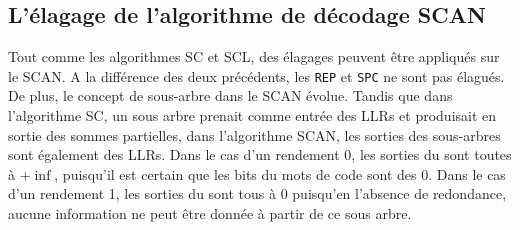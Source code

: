 \subsection{L'élagage de l'algorithme de décodage SCAN}
Tout comme les algorithmes SC et SCL, des élagages peuvent être appliqués sur le SCAN. A la différence des deux précédents, les \noeuds \texttt{REP} et \texttt{SPC} ne sont pas élagués. De plus, le concept de sous-arbre dans le SCAN évolue. Tandis que dans l'algorithme SC, un sous arbre prenait comme entrée des LLRs et produisait en sortie des sommes partielles, dans l'algorithme SCAN, les sorties des sous-arbres sont également des LLRs. Dans le cas d'un rendement 0, les sorties du \noeud sont toutes à $+\inf$, puisqu'il est certain que les bits du mots de code sont des $0$. Dans le cas d'un rendement 1, les sorties du \noeud sont tous à $0$ puisqu'en l'absence de redondance, aucune information ne peut être donnée à partir de ce sous arbre.



